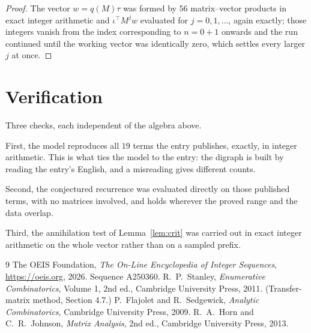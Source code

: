 \documentclass[11pt,a4paper]{article}
\theoremstyle{plain}
\theoremstyle{definition}
\begin{document}
\begin{proof}
The vector $w=q(M)\tau$ was formed by $56$ matrix--vector products in exact integer
arithmetic and $\iota^{\!\top}M^{j}w$ evaluated for $j=0,1,\dots$, again exactly; those
integers vanish from the index corresponding to $n=0+1$ onwards and the run continued
until the working vector was identically zero, which settles every larger $j$ at once.
\end{proof}

\section{Verification}

Three checks, each independent of the algebra above.

First, the model reproduces all $19$ terms the entry publishes, exactly, in integer
arithmetic. This is what ties the model to the entry: the digraph is built by reading the
entry's English, and a misreading gives different counts.

Second, the conjectured recurrence was evaluated directly on those published terms, with no
matrices involved, and holds wherever the proved range and the data overlap.

Third, the annihilation test of Lemma~\ref{lem:crit} was carried out in exact integer
arithmetic on the whole vector rather than on a sampled prefix.

\begin{thebibliography}{9}
 The OEIS Foundation, \emph{The On-Line Encyclopedia of Integer
Sequences}, \url{https://oeis.org}, 2026. Sequence A250360.
 R.~P.~Stanley, \emph{Enumerative Combinatorics}, Volume 1, 2nd ed.,
Cambridge University Press, 2011. (Transfer-matrix method, Section 4.7.)
 P.~Flajolet and R.~Sedgewick, \emph{Analytic Combinatorics}, Cambridge
University Press, 2009.
 R.~A.~Horn and C.~R.~Johnson, \emph{Matrix Analysis}, 2nd ed., Cambridge
University Press, 2013.
\end{thebibliography}
\end{document}
